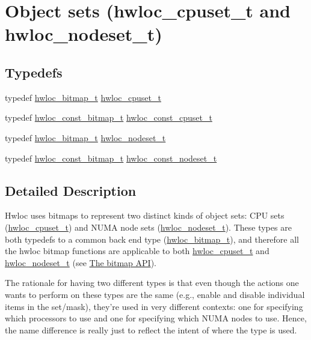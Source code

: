 \hypertarget{a00040}{
\section{Object sets (hwloc\_\-cpuset\_\-t and hwloc\_\-nodeset\_\-t)}
\label{a00040}
}
\subsection*{Typedefs}
\begin{DoxyCompactItemize}
\item 
typedef \hyperlink{a00065_gaa3c2bf4c776d603dcebbb61b0c923d84}{hwloc\_\-bitmap\_\-t} \hyperlink{a00040_ga4bbf39b68b6f568fb92739e7c0ea7801}{hwloc\_\-cpuset\_\-t}
\item 
typedef \hyperlink{a00065_ga2fb1bbc8aea1ea22dee2f0fd39659f48}{hwloc\_\-const\_\-bitmap\_\-t} \hyperlink{a00040_ga1f784433e9b606261f62d1134f6a3b25}{hwloc\_\-const\_\-cpuset\_\-t}
\item 
typedef \hyperlink{a00065_gaa3c2bf4c776d603dcebbb61b0c923d84}{hwloc\_\-bitmap\_\-t} \hyperlink{a00040_ga37e35730fa7e775b5bb0afe893d6d508}{hwloc\_\-nodeset\_\-t}
\item 
typedef \hyperlink{a00065_ga2fb1bbc8aea1ea22dee2f0fd39659f48}{hwloc\_\-const\_\-bitmap\_\-t} \hyperlink{a00040_ga2f5276235841ad66a79bedad16a5a10c}{hwloc\_\-const\_\-nodeset\_\-t}
\end{DoxyCompactItemize}


\subsection{Detailed Description}
Hwloc uses bitmaps to represent two distinct kinds of object sets: CPU sets (\hyperlink{a00040_ga4bbf39b68b6f568fb92739e7c0ea7801}{hwloc\_\-cpuset\_\-t}) and NUMA node sets (\hyperlink{a00040_ga37e35730fa7e775b5bb0afe893d6d508}{hwloc\_\-nodeset\_\-t}). These types are both typedefs to a common back end type (\hyperlink{a00065_gaa3c2bf4c776d603dcebbb61b0c923d84}{hwloc\_\-bitmap\_\-t}), and therefore all the hwloc bitmap functions are applicable to both \hyperlink{a00040_ga4bbf39b68b6f568fb92739e7c0ea7801}{hwloc\_\-cpuset\_\-t} and \hyperlink{a00040_ga37e35730fa7e775b5bb0afe893d6d508}{hwloc\_\-nodeset\_\-t} (see \hyperlink{a00065}{The bitmap API}).

The rationale for having two different types is that even though the actions one wants to perform on these types are the same (e.g., enable and disable individual items in the set/mask), they're used in very different contexts: one for specifying which processors to use and one for specifying which NUMA nodes to use. Hence, the name difference is really just to reflect the intent of where the type is used. 

